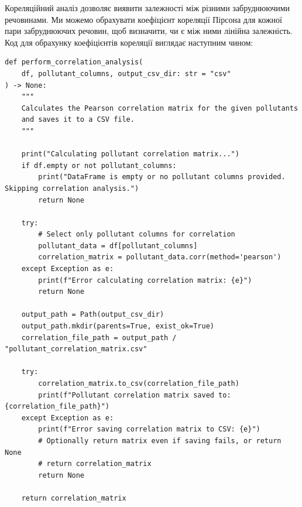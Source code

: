 \documentclass{exam_template}
\begin{document}
Кореляційний аналіз дозволяє виявити залежності між різними забруднюючими
речовинами. Ми можемо обрахувати коефіцієнт кореляції Пірсона для кожної пари
забруднюючих речовин, щоб визначити, чи є між ними лінійна залежність. 
Код для обрахунку коефіцієнтів кореляції виглядає наступним чином:
\begin{verbatim}
def perform_correlation_analysis(
    df, pollutant_columns, output_csv_dir: str = "csv"
) -> None:
    """
    Calculates the Pearson correlation matrix for the given pollutants
    and saves it to a CSV file.
    """
    
    print("Calculating pollutant correlation matrix...")
    if df.empty or not pollutant_columns:
        print("DataFrame is empty or no pollutant columns provided. Skipping correlation analysis.")
        return None

    try:
        # Select only pollutant columns for correlation
        pollutant_data = df[pollutant_columns]
        correlation_matrix = pollutant_data.corr(method='pearson')
    except Exception as e:
        print(f"Error calculating correlation matrix: {e}")
        return None

    output_path = Path(output_csv_dir)
    output_path.mkdir(parents=True, exist_ok=True) 
    correlation_file_path = output_path / "pollutant_correlation_matrix.csv"

    try:
        correlation_matrix.to_csv(correlation_file_path)
        print(f"Pollutant correlation matrix saved to: {correlation_file_path}")
    except Exception as e:
        print(f"Error saving correlation matrix to CSV: {e}")
        # Optionally return matrix even if saving fails, or return None
        # return correlation_matrix
        return None

    return correlation_matrix
\end{verbatim}
\end{document}
